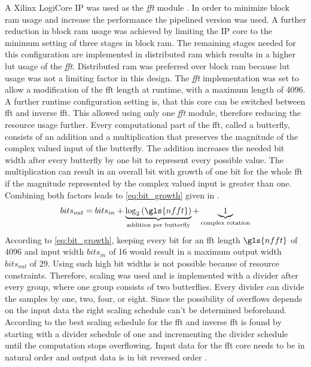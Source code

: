 \documentclass[12pt,a4paper,parskip=full,abstract=true,BCOR=12mm]{scrreprt}
\def\device#1{\mbox{\textit{#1}}}
\begin{document}
A Xilinx LogiCore IP was used as the \device{fft} module \cite{xilinx_fft}. In
order to minimize block \gls{ram} usage and increase the performance the
pipelined version was used. A further reduction in block \gls{ram} usage was achieved
by limiting the IP core to the minimum setting of three stages in block \gls{ram}. The
remaining stages needed for this configuration are implemented in distributed \gls{ram} which
results in a higher \gls{lut} usage of the \device{fft}\cite{xilinx_fft,virtex5}. Distributed
\gls{ram} was preferred over block \gls{ram} because \gls{lut} usage was not a limiting factor
in this design. The \device{fft} implementation was set to allow a modification of the
\gls{fft} length at runtime, with a maximum length of \num{4096}. A further runtime configuration
setting is, that this core can be switched between \gls{fft} and inverse \gls{fft}. This
allowed using only one \device{fft} module, therefore reducing the resource usage further. Every
computational part of the \gls{fft}, called a butterfly, consists of an addition and a multiplication
that preserves the magnitude of the complex valued input of the butterfly. The addition
increases the needed bit width after every butterfly by one bit to represent every
possible value. The multiplication can result in an overall bit with growth of one bit for the
whole \gls{fft} if the magnitude represented by the complex valued input is greater than one.
Combining both factors leads to \cref{eq:bit_growth} given in \cite{xilinx_fft}.
\begin{equation}
    \label{eq:bit_growth}
    bits_{out} = bits_{in} + \underbrace{\log_2\left(\gls{nfft}\right)}_{\text{addition per butterfly}} + \underbrace{1}_{\text{complex rotation}}
\end{equation}
According to \cref{eq:bit_growth}, keeping every bit for an \gls{fft} length $\gls{nfft}$ of \num{4096}
and input width $bits_{in}$ of \SI{16}{\bit} would result in a maximum output width $bits_{out}$
of \SI{29}{\bit}. Using such high bit widths is not possible because of resource constraints.
Therefore, scaling was used and is implemented with a divider after every group, where one group
consists of two butterflies. Every divider can divide the samples by one, two, four, or eight.
Since the possibility of overflows depends on the input data the right scaling schedule can't
be determined beforehand. According to \cite{xilinx_fft} the best scaling schedule for the
\gls{fft} and inverse \gls{fft} is found by starting with a divider schedule of one and incrementing
the divider schedule until the computation stops overflowing. Input data for the \gls{fft} core
needs to be in natural order and output data is in bit reversed order \cite{xilinx_fft}.
\end{document}
